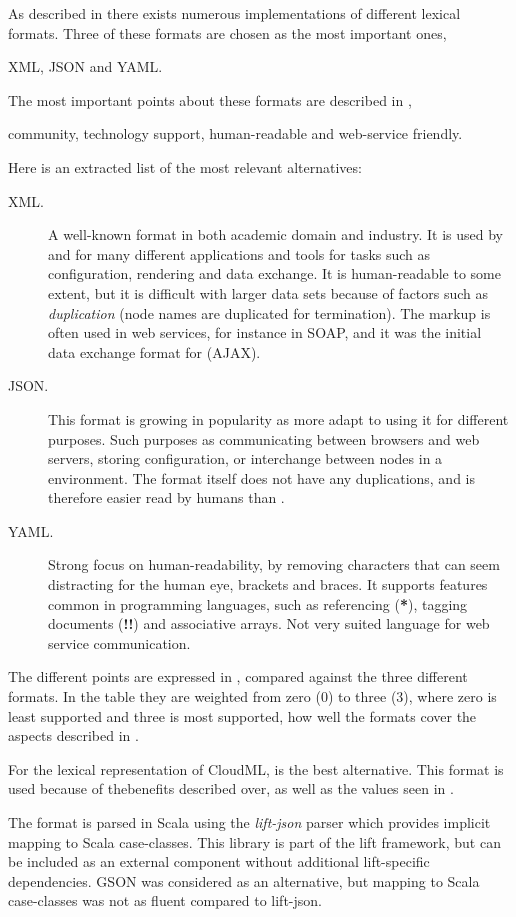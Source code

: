 As described in  there exists numerous implementations of different lexical formats.
Three of these formats are chosen as the most important ones,
\begin{ii}
  \iitem XML,
  \iitem JSON and
  \iitem YAML.
\end{ii}
The most important points about these formats are described in ,
\ie
\begin{ii}
  \iitem community,
  \iitem technology support,
  \iitem human-readable and
  \iitem web-service friendly.
\end{ii}
Here is an extracted list of the most relevant alternatives:
\begin{description}
  \item[XML.] A well-known format in both academic domain and industry.
    It is used by and for many different applications and tools for tasks such as configuration,
    rendering and data exchange.
    It is human-readable to some extent, but it is difficult with larger data sets because
    of factors such as \emph{duplication} (node names are duplicated for termination). 
    The markup is often used in web services, for instance in SOAP, 
    and it was the initial data exchange format for  (AJAX).
  \item[JSON.] This format is growing in popularity as more adapt to using it for
    different purposes.
    Such purposes as communicating between browsers and web servers, storing configuration,
    or interchange between nodes in a  environment.
    The format itself does not have any duplications, and is therefore easier read by humans
    than .
  \item[YAML.] Strong focus on human-readability, by removing characters that can seem
    distracting for the human eye, \eg brackets and braces.
    It supports features common in programming languages, such as
    \eg referencing (\textbf{*}), tagging documents (\textbf{!!}) and associative arrays.
    Not very suited language for web service communication.
\end{description}
The different points are expressed in , 
compared against the three different formats.
In the table they are weighted from zero ($0$) to three ($3$),
where zero is least supported and three is most supported,
\ie how well the formats cover the aspects described in .

For the lexical representation of CloudML,  is the best alternative.
This format is used because of thebenefits described over,
as well as the values seen in .


The  format is parsed in Scala using the \emph{lift-json} parser which provides implicit
mapping to Scala case-classes. This library is part of the lift framework,
but can be included as an external component without additional lift-specific dependencies.
GSON was considered as an alternative, but mapping to Scala case-classes was not as 
fluent compared to lift-json.

